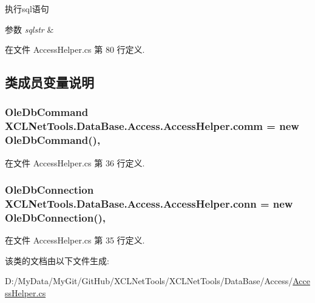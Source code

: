 执行sql语句 


\begin{DoxyParams}{参数}
{\em sqlstr} & \\
\hline
\end{DoxyParams}


在文件 Access\-Helper.\-cs 第 80 行定义.



\subsection{类成员变量说明}
\hypertarget{class_x_c_l_net_tools_1_1_data_base_1_1_access_1_1_access_helper_a11c37781255094b6abb069cf0b5c65df}{
\subsubsection[{comm}]{\setlength{\rightskip}{0pt plus 5cm}Ole\-Db\-Command X\-C\-L\-Net\-Tools.\-Data\-Base.\-Access.\-Access\-Helper.\-comm = new Ole\-Db\-Command()\hspace{0.3cm}{\ttfamily [static]}, {\ttfamily [protected]}}}\label{class_x_c_l_net_tools_1_1_data_base_1_1_access_1_1_access_helper_a11c37781255094b6abb069cf0b5c65df}


在文件 Access\-Helper.\-cs 第 36 行定义.

\hypertarget{class_x_c_l_net_tools_1_1_data_base_1_1_access_1_1_access_helper_a6eacbf7cab97849252853ed926ffeb7e}{
\subsubsection[{conn}]{\setlength{\rightskip}{0pt plus 5cm}Ole\-Db\-Connection X\-C\-L\-Net\-Tools.\-Data\-Base.\-Access.\-Access\-Helper.\-conn = new Ole\-Db\-Connection()\hspace{0.3cm}{\ttfamily [static]}, {\ttfamily [protected]}}}\label{class_x_c_l_net_tools_1_1_data_base_1_1_access_1_1_access_helper_a6eacbf7cab97849252853ed926ffeb7e}


在文件 Access\-Helper.\-cs 第 35 行定义.



该类的文档由以下文件生成\-:\begin{DoxyCompactItemize}
\item 
D\-:/\-My\-Data/\-My\-Git/\-Git\-Hub/\-X\-C\-L\-Net\-Tools/\-X\-C\-L\-Net\-Tools/\-Data\-Base/\-Access/\hyperlink{_access_helper_8cs}{Access\-Helper.\-cs}\end{DoxyCompactItemize}
